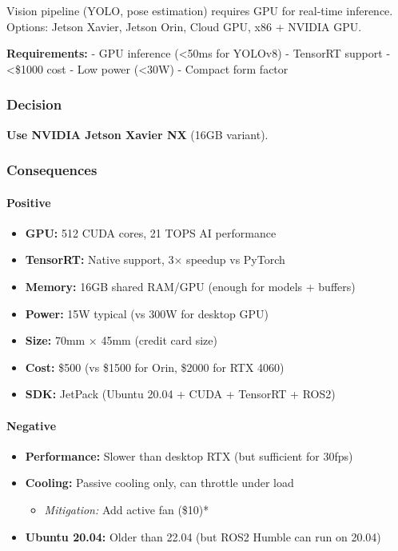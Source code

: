 \documentclass[
]{article}
\providecommand{\tightlist}{%
  \setlength{\itemsep}{0pt}\setlength{\parskip}{0pt}}
\begin{document}
Vision pipeline (YOLO, pose estimation) requires GPU for real-time
inference. Options: Jetson Xavier, Jetson Orin, Cloud GPU, x86 + NVIDIA
GPU.

\textbf{Requirements:} - GPU inference (\textless50ms for YOLOv8) -
TensorRT support - \textless\$1000 cost - Low power (\textless30W) -
Compact form factor

\hypertarget{decision-14}{%
\subsubsection{Decision}\label{decision-14}}

\textbf{Use NVIDIA Jetson Xavier NX} (16GB variant).

\hypertarget{consequences-14}{%
\subsubsection{Consequences}\label{consequences-14}}

\hypertarget{positive-14}{%
\paragraph{Positive}\label{positive-14}}

\begin{itemize}
\tightlist
\item
  \textbf{GPU:} 512 CUDA cores, 21 TOPS AI performance
\item
  \textbf{TensorRT:} Native support, 3× speedup vs PyTorch
\item
  \textbf{Memory:} 16GB shared RAM/GPU (enough for models + buffers)
\item
  \textbf{Power:} 15W typical (vs 300W for desktop GPU)
\item
  \textbf{Size:} 70mm × 45mm (credit card size)
\item
  \textbf{Cost:} \$500 (vs \$1500 for Orin, \$2000 for RTX 4060)
\item
  \textbf{SDK:} JetPack (Ubuntu 20.04 + CUDA + TensorRT + ROS2)
\end{itemize}

\hypertarget{negative-14}{%
\paragraph{Negative}\label{negative-14}}

\begin{itemize}
\tightlist
\item
  \textbf{Performance:} Slower than desktop RTX (but sufficient for
  30fps)
\item
  \textbf{Cooling:} Passive cooling only, can throttle under load

  \begin{itemize}
  \tightlist
  \item
    \emph{Mitigation:} Add active fan (\$10)*
  \end{itemize}
\item
  \textbf{Ubuntu 20.04:} Older than 22.04 (but ROS2 Humble can run on
  20.04)
\end{itemize}
\end{document}
